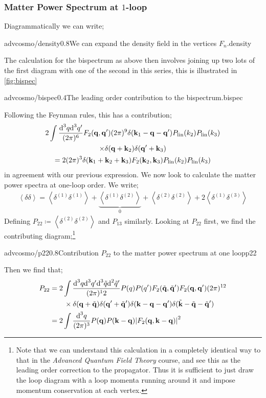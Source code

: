 \subsubsection{Matter Power Spectrum at $1$-loop}
Diagrammatically we can write;
\begin{mygraphic}{advcosmo/density}{0.8}{We can expand the density field in the vertices $F_n$.}{density}\end{mygraphic}
The calculation for the bispectrum as above then involves joining up two lots of the first diagram with one of the second in this series, this is illustrated in \autoref{fig:bispec}
\begin{mygraphic}{advcosmo/bispec}{0.4}{The leading order contribution to the bispectrum.}{bispec}\end{mygraphic}
Following the Feynman rules, this has a contribution;
\begin{multline*}
2\int{\frac{\text{d}^3 q\text{d}^3 q^{\prime}}{(2\pi)^6}F_2(\mathbf{q}, \mathbf{q}^{\prime})(2\pi)^9 \delta(\mathbf{k}_1 - \mathbf{q} - \mathbf{q}^{\prime})P_{\text{lin}}(k_2)P_{\text{lin}}(k_3)} \\ \times \delta(\mathbf{q} + \mathbf{k}_2)\delta(\mathbf{q}^{\prime} + \mathbf{k}_3) \\ = 2(2\pi)^3 \delta(\mathbf{k}_1 + \mathbf{k}_2 + \mathbf{k}_3)F_2(\mathbf{k}_2, \mathbf{k}_3)P_{\text{lin}}(k_2)P_{\text{lin}}(k_3)
\end{multline*}
in agreement with our previous expression. We now look to calculate the matter power spectra at one-loop order. We write;
\begin{align*}
\left< \delta \delta \right> = \left< \delta^{(1)}\delta^{(1)} \right> + \underbrace{\left< \delta^{(1)}\delta^{(2)} \right>}_{0} + \left< \delta^{(2)}\delta^{(2)} \right> + 2\left< \delta^{(1)}\delta^{(3)} \right>
\end{align*}
Defining $P_{22} \coloneqq \left< \delta^{(2)}\delta^{(2)} \right>$ and $P_{13}$ similarly. Looking at $P_{22}$ first, we find the contributing diagram;\footnote{Note that we can understand this calculation in a completely identical way to that in the \emph{Advanced Quantum Field Theory} course, and see this as the leading order correction to the propagator. Thus it is sufficient to just draw the loop diagram with a loop momenta running around it and impose momentum conservation at each vertex.}
\begin{mygraphic}{advcosmo/p22}{0.8}{Contribution $P_{22}$ to the matter power spectrum at one loop}{p22}\end{mygraphic}
Then we find that;
\begin{align*}
P_{22} &= 2\int{\frac{\ud^3 q \ud^3 q\pr \ud^3 \tilde{q}\ud^2 \tilde{q}\pr}{(2\pi)^12}P(q)P(q\pr)F_2(\tilde{\vec{q}}, \tilde{\vec{q}}\pr)F_2(\vec{q}, \vec{q}\pr)(2\pi)^{12}} \\
& \qquad \times \delta(\vec{q} + \tilde{\vec{q}})\delta(\vec{q}\pr + \tilde{\vec{q}}\pr)\delta(\vec{k} - \vec{q} - \vec{q}\pr)\delta(\tilde{\vec{k}} - \tilde{\vec{q}} - \tilde{\vec{q}}\pr) \\
&= 2\int{\frac{\ud^3 q}{(2\pi)^3}P(\vec{q})P(\vec{k} - \vec{q})\abs{F_2(\vec{q}, \vec{k} - \vec{q})}^2}
\end{align*}
